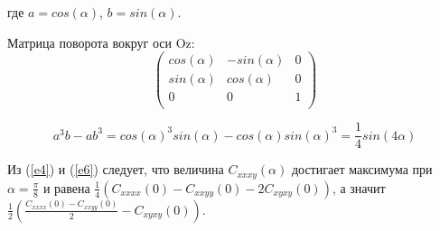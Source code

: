 \documentclass[a4paper,12pt]{article}
\begin{document}
где $a = cos(\alpha)$, $b = sin(\alpha)$.

Матрица поворота вокруг оси Oz:
\begin{equation} \label{e5}
\begin{pmatrix} 
cos(\alpha) & -sin(\alpha) & 0 \\
sin(\alpha) & cos(\alpha) & 0 \\
0 & 0 & 1 \\
\end{pmatrix} 
\end{equation} 

\begin{equation} \label{e6}
a^3 b - a b^3 = cos(\alpha)^3sin(\alpha) - cos(\alpha)sin(\alpha)^3 = \frac{1}{4}sin(4\alpha)
\end{equation}

Из (\ref{e4}) и (\ref{e6}) следует, что величина $C_{xxxy}(\alpha)$ достигает максимума при 
$\alpha = \frac{\pi}{8}$ и равена $\frac{1}{4}(C_{xxxx}(0) - C_{xxyy}(0) - 2 C_{xyxy}(0))$, а значит 
$\frac{1}{2}(\frac{C_{xxxx}(0) - C_{xxyy}(0)}{2} - C_{xyxy}(0))$.

\end{document}
